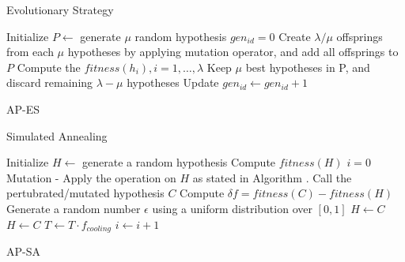 \documentclass{beamer}
\begin{document}
    \begin{frame}[t]{Evolutionary Strategy}
        \fontsize{8}{12}\selectfont
        \begin{algorithm}[H]
            Initialize $P\leftarrow$ generate $\mu$ random hypothesis \;
            $gen_{id}=0$ \;
             {
                Create $\lambda / \mu$ offsprings from  each $\mu$ hypotheses by applying mutation operator, and add all offsprings to $P$ \;
                Compute the $fitness(h_i), i=1,\ldots, \lambda$ \;
                Keep $\mu$ best hypotheses in P, and discard remaining $\lambda - \mu$ hypotheses \;
                Update $gen_{id} \leftarrow gen_{id}+1$
            }
            \caption{AP-ES}
        \end{algorithm}
    \end{frame}

    \begin{frame}[t]{Simulated Annealing}
        \fontsize{8}{8}\selectfont
        \begin{algorithm}[H]
            Initialize $H\leftarrow$ generate a random hypothesis \;
            Compute $fitness(H)$  \;
            $i=0$ \;
             {
                Mutation - Apply the operation on $H$ as stated in Algorithm . Call the pertubrated/mutated hypothesis $C$ \;
                Compute $\delta f = fitness(C) -fitness(H) $ \;
                 {
                    Generate a random number $\epsilon$ using a uniform distribution over $[0,1]$ \;
                     {
                        $H \leftarrow C$
                    }}  {
                    $H \leftarrow C$ \; }
                    $T \leftarrow T \cdot f_{cooling}$ \;
                    $i \leftarrow i + 1$ \;
                } 
                \caption{AP-SA}
                \label{alg:ap-sa}
            \end{algorithm}
        \end{frame}
\end{document}
